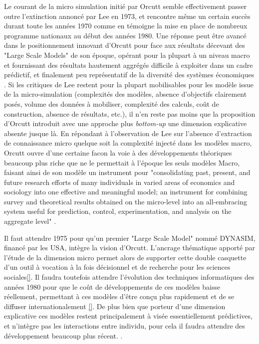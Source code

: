 Le courant de la micro simulation initié par Orcutt semble effectivement passer outre l'extinction annoncé par Lee en 1973, et rencontre même un certain succès durant toute les années 1970 comme en témoigne la mise en place de nombreux programme nationaux au début des années 1980. \cite{Baroni2007} Une réponse peut être avancé dans le positionnement innovant d'Orcutt pour face aux résultats décevant des "Large Scale Models" de son époque, opérant pour la plupart à un niveau macro et fournissant des résultats hautement aggrégés difficile à exploiter dans un cadre prédictif, et finalement peu représentatif de la diversité des systèmes économiques \cite{Birkin2012} \cite{Baroni2007}. Si les critiques de Lee restent pour la plupart mobilisables pour les modèle issue de la micro-simulation (complexités des modèles, absence d'objectifs clairement posés, volume des données à mobiliser, complexité des calculs, coût de construction, absence de résultats, etc.), il n'en reste pas moins que la proposition d'Orcutt introduit avec une approche plus \textit{bottom-up} une dimension explicative absente jusque là. En répondant à l'observation de Lee sur l'absence d'extraction de connaissance micro quelque soit la complexité injecté dans les modèles macro, Orcutt ouvre d'une certaine facon la voie à des développements théoriques beaucoup plus riche que ne le permettait à l'époque les seuls modèles Macro, faisant ainsi de son modèle un instrument pour "consolidating past, present, and future research efforts of many individuals in varied areas of economics and sociology into one effective and meaningful model; an instrument for combining survey and theoretical results obtained on the micro-level into an all-embracing system useful for prediction, control, experimentation, and analysis on the aggregate level" \autocite[122]{Cohen1961}\autocite{Orcutt?}.

Il faut attendre 1975 pour qu'un premier "Large Scale Model" nommé DYNASIM, financé par les USA, intègre la vision d'Orcutt. L'ancrage thématique apporté par l'étude de la dimension micro permet alors de supporter cette double casquette d'un outil à vocation à la fois décisionnel et de recherche pour les sciences sociales\ref{}.  Il faudra toutefois attendre l'évolution des techniques informatiques des années 1980 pour que le coût de développements de ces modèles baisse réellement, permettant à ces modèles d'être conçu plus rapidement et de se diffuser internationalement \ref{}. De plus bien que porteur d'une dimension explicative ces modèles restent principalement à visée essentiellement prédictives, et n'intègre pas les interactions entre individu, pour cela il faudra attendre des développement beaucoup plus récent. \autocite{Sanders2007}.

